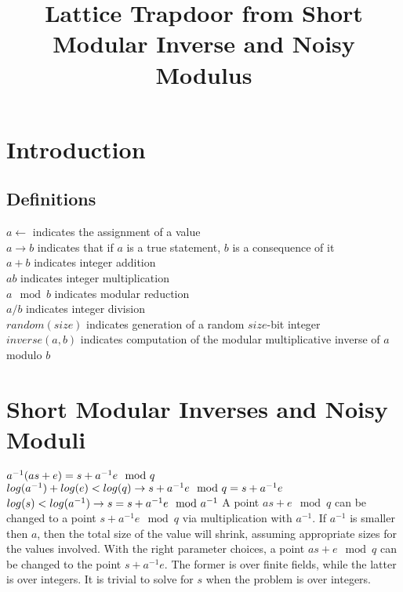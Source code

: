 \documentclass[preprint]{iacrtrans}
\author{}
\institute{}
\title[Lattice Trapdoor from Short Modular Inverse and Noisy Modulus]{Lattice Trapdoor from Short Modular Inverse and Noisy Modulus}
\begin{document}
\maketitle


\begin{abstract}
\todo{}
 \end{abstract}

\section{Introduction}
\todo{}

\subsection{Definitions}
$a \leftarrow$ indicates the assignment of a value\\
$a \rightarrow b$ indicates that if $a$ is a true statement, $b$ is a consequence of it\\
$a + b$ indicates integer addition\\
$a b$ indicates integer multiplication\\
$a \mod b$ indicates modular reduction\\
$a / b$ indicates integer division\\
$random(size)$ indicates generation of a random $size$-bit integer\\
$inverse(a, b)$ indicates computation of the modular multiplicative inverse of $a$ modulo $b$\\

\section{Short Modular Inverses and Noisy Moduli}
$a^{-1} (a s + e) = s + a^{-1} e \mod q\\ \\$
$log(a^{-1}) + log(e) < log(q) \rightarrow s + a^{-1} e \mod q = s + a^{-1} e\\ \\$
$log(s) < log(a^{-1}) \rightarrow s = s + a^{-1} e \mod a^{-1}\\ \\$
A point $a s + e \mod q$  can be changed to a point $s + a^{-1} e \mod q$ via multiplication with $a^{-1}$. If $a^{-1}$ is smaller then $a$, then the total size of the value will shrink, assuming appropriate sizes for the values involved. With the right parameter choices, a point $a s + e \mod q$ can be changed to the point $s + a^{-1} e$. The former is over finite fields, while the latter is over integers. It is trivial to solve for $s$ when the problem is over integers.
\end{document}
